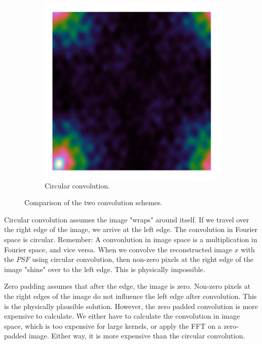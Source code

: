 \begin{figure}[h]
\begin{subfigure}[b]{0.3\linewidth}
		\includegraphics[width=\linewidth, clip, trim= 0.25in 0.25in 0.25in 0.25in]{./chapters/03.cd/simulated/psfCircular.png}
		\caption{Circular convolution.}
		\label{cd:efficient:convolution:circular}
	\end{subfigure}
	\caption{Comparison of the two convolution schemes.}
	\label{cd:efficient:convolution:figure}
\end{figure}

Circular convolution assumes the image "wraps" around itself. If we travel over the right edge of the image, we arrive at the left edge. The convolution in Fourier space is circular. Remember: A convonlution in image space is a multiplication in Fourier space, and vice versa. When we convolve the reconstructed image $x$ with the $PSF$ using circular convolution, then non-zero pixels at the right edge of the image "shine" over to the left edge. This is physically impossible.

Zero padding assumes that after the edge, the image is zero. Non-zero pixels at the right edges of the image do not influence the left edge after convolution. This is the physically plausible solution. However, the zero padded convolution is more expensive to calculate. We either have to calculate the convolution in image space, which is too expensive for large kernels, or apply the FFT on a zero-padded image. Either way, it is more expensive than the circular convolution.

